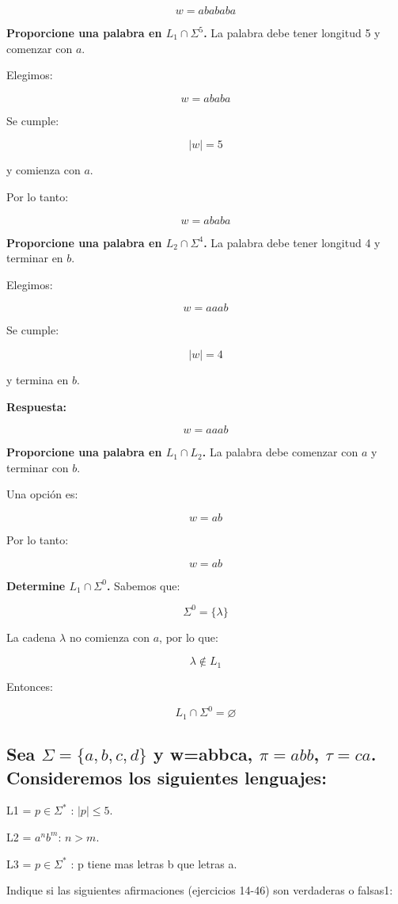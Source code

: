 \documentclass[12pt]{article}
\begin{document}
\[
\boxed{w=abababa}
\]

\textbf{Proporcione una palabra en $L_1\cap\Sigma^5$.}
La palabra debe tener longitud 5 y comenzar con $a$.

Elegimos:

\[
w=ababa
\]

Se cumple:

\[
|w|=5
\]

y comienza con $a$.

Por lo tanto:

\[
\boxed{w=ababa}
\]


\textbf{Proporcione una palabra en $L_2\cap\Sigma^4$.}
La palabra debe tener longitud 4 y terminar en $b$.

Elegimos:

\[
w=aaab
\]

Se cumple:

\[
|w|=4
\]

y termina en $b$.

\textbf{Respuesta:}

\[
\boxed{w=aaab}
\]

\textbf{Proporcione una palabra en $L_1\cap L_2$.}
La palabra debe comenzar con $a$ y terminar con $b$.

Una opción es:

\[
w=ab
\]

Por lo tanto:

\[
\boxed{w=ab}
\]


\textbf{Determine $L_1\cap\Sigma^0$.}
Sabemos que:

\[
\Sigma^0=\{\lambda\}
\]

La cadena $\lambda$ no comienza con $a$, por lo que:

\[
\lambda\notin L_1
\]

Entonces:

\[
\boxed{L_1\cap\Sigma^0=\varnothing}
\]

\subsection{Sea $\Sigma= \{a,b,c,d\}$ y w=abbca, $\pi =abb$, $\tau =ca$. Consideremos los siguientes lenguajes:}

L1 = {$p \in \Sigma^*$ : $|p| \leq 5$}.

L2 = {$a^n b^m $: $n>m$}.

L3 = {$p \in \Sigma^*$ : p tiene mas letras b que letras a}.

Indique si las siguientes afirmaciones (ejercicios 14-46) son verdaderas o falsas1:
\end{document}
